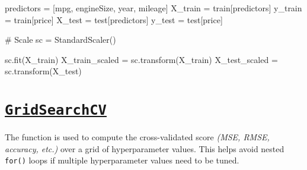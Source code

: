 \documentclass[
  letterpaper,
  DIV=11,
  numbers=noendperiod]{scrreprt}
\newenvironment{Shaded}{\begin{snugshade}}{\end{snugshade}}
\newcommand{\CommentTok}[1]{\textcolor[rgb]{0.37,0.37,0.37}{#1}}
\newcommand{\NormalTok}[1]{\textcolor[rgb]{0.00,0.23,0.31}{#1}}
\newcommand{\OperatorTok}[1]{\textcolor[rgb]{0.37,0.37,0.37}{#1}}
\newcommand{\StringTok}[1]{\textcolor[rgb]{0.13,0.47,0.30}{#1}}
\begin{document}
\begin{Shaded}
\begin{Highlighting}[]
\NormalTok{predictors }\OperatorTok{=}\NormalTok{ [}\StringTok{\textquotesingle{}mpg\textquotesingle{}}\NormalTok{, }\StringTok{\textquotesingle{}engineSize\textquotesingle{}}\NormalTok{, }\StringTok{\textquotesingle{}year\textquotesingle{}}\NormalTok{, }\StringTok{\textquotesingle{}mileage\textquotesingle{}}\NormalTok{]}
\NormalTok{X\_train }\OperatorTok{=}\NormalTok{ train[predictors]}
\NormalTok{y\_train }\OperatorTok{=}\NormalTok{ train[}\StringTok{\textquotesingle{}price\textquotesingle{}}\NormalTok{]}
\NormalTok{X\_test }\OperatorTok{=}\NormalTok{ test[predictors]}
\NormalTok{y\_test }\OperatorTok{=}\NormalTok{ test[}\StringTok{\textquotesingle{}price\textquotesingle{}}\NormalTok{]}

\CommentTok{\# Scale}
\NormalTok{sc }\OperatorTok{=}\NormalTok{ StandardScaler()}

\NormalTok{sc.fit(X\_train)}
\NormalTok{X\_train\_scaled }\OperatorTok{=}\NormalTok{ sc.transform(X\_train)}
\NormalTok{X\_test\_scaled }\OperatorTok{=}\NormalTok{ sc.transform(X\_test)}
\end{Highlighting}
\end{Shaded}

\section{\texorpdfstring{\href{https://scikit-learn.org/stable/modules/generated/sklearn.model_selection.GridSearchCV.html}{\texttt{GridSearchCV}}}{GridSearchCV}}\label{gridsearchcv}

The function is used to compute the cross-validated score \emph{(MSE,
RMSE, accuracy, etc.)} over a grid of hyperparameter values. This helps
avoid nested \texttt{for()} loops if multiple hyperparameter values need
to be tuned.
\end{document}
